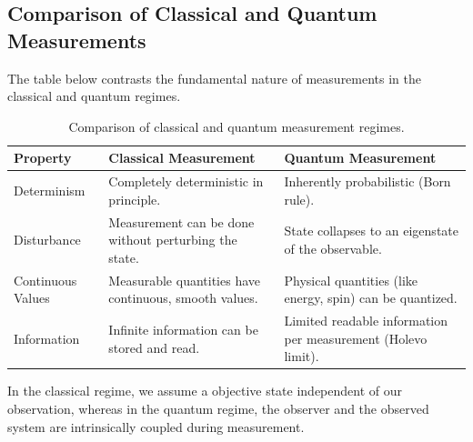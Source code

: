 \subsection{Comparison of Classical and Quantum Measurements}

The table below contrasts the fundamental nature of measurements in the classical and quantum regimes.

\begin{table}[h]
\centering
\sffamily
\small
\begin{tabularx}{\textwidth}{lXX}
\toprule
\rowcolor{bglight} \textbf{Property} & \textbf{Classical Measurement} & \textbf{Quantum Measurement} \\
\midrule
Determinism & Completely deterministic in principle. & Inherently probabilistic (Born rule). \\
Disturbance & Measurement can be done without perturbing the state. & State collapses to an eigenstate of the observable. \\
Continuous Values & Measurable quantities have continuous, smooth values. & Physical quantities (like energy, spin) can be quantized. \\
Information & Infinite information can be stored and read. & Limited readable information per measurement (Holevo limit). \\
\bottomrule
\end{tabularx}
\caption{Comparison of classical and quantum measurement regimes.}
\label{tab:measurement_comparison}
\end{table}

In the classical regime, we assume a objective state independent of our observation, whereas in the quantum regime, the observer and the observed system are intrinsically coupled during measurement.
